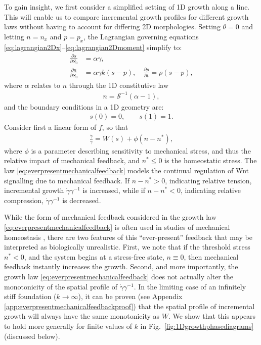 To gain insight, we first consider a simplified setting of 1D growth along a line. This will enable us to compare incremental growth profiles for different growth laws without having to account for differing 2D morphologies. Setting $\theta = 0$ and letting $n = n_x$ and $p = p_x$, the Lagrangian governing equations \eqref{eq:lagrangian2Dx}--\eqref{eq:lagrangian2Dmoment} simplify to:
\begin{align}
\frac{\partial s}{\partial S_0} &= \alpha\gamma,\label{eq:1Dgeom}\\
\frac{\partial n}{\partial S_0} &= \alpha\gamma k(s - p), \quad \frac{\partial p}{\partial t} = \rho(s - p),\label{eq:1Dforce}
\end{align}
where $\alpha$ relates to $n$ through the 1D constitutive law
\begin{align}
n = \mathcal{S}^{-1}(\alpha - 1),\label{eq:1Delasticstretch}
\end{align}
and the boundary conditions in a 1D geometry are:
\begin{align}
s(0) = 0, \qquad s(1) = 1.\label{eq:1DBCs}
\end{align}
Consider first a linear form of $f$, so that
\begin{align}
\frac{\dot{\gamma}}{\gamma} = W(s) + \phi(n - n^*),\label{eq:everpresentmechanicalfeedback}
\end{align}
where $\phi$ is a parameter describing sensitivity to mechanical stress, and thus the relative impact of mechanical feedback, and $n^* \le 0$ is the homeostatic stress. The law \eqref{eq:everpresentmechanicalfeedback} models the continual regulation of Wnt signalling due to mechanical feedback. If $n- n^* > 0$, indicating relative tension, incremental growth $\dot{\gamma}\gamma^{-1}$ is increased, while if $n - n^* < 0$, indicating relative compression, $\dot{\gamma}\gamma^{-1}$ is decreased.

While the form of mechanical feedback considered in the growth law \eqref{eq:everpresentmechanicalfeedback} is often used in studies of mechanical homeostasis \cite{erlich2019homeostatic}, there are two features of this ``ever-present'' feedback that may be interpreted as biologically unrealistic. First, we note that if the threshold stress $n^* < 0$, and the system begins at a stress-free state, $n\equiv0$, then mechanical feedback instantly increases the growth. Second, and more importantly, the growth law \eqref{eq:everpresentmechanicalfeedback} does not actually alter the monotonicity of the spatial profile of $\dot{\gamma}\gamma^{-1}$. In the limiting case of an infinitely stiff foundation ($k\to\infty$), it can be proven (see Appendix \ref{app:everpresentmechanicalfeedbackproof}) that the spatial profile of incremental growth will always have the same monotonicity as $W$. We show that this appears to hold more generally for finite values of $k$ in Fig.\ \ref{fig:1Dgrowthphasediagrams} (discussed below). 

